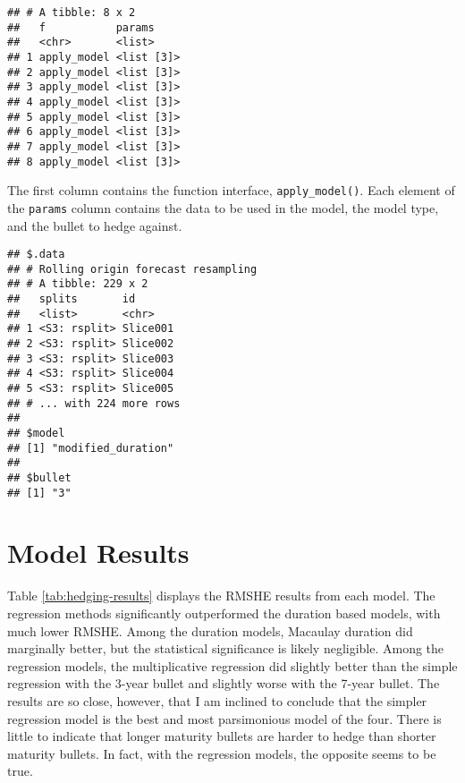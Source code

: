 \documentclass[openany]{book}
\newenvironment{Shaded}{\begin{snugshade}}{\end{snugshade}}
\newcommand{\DecValTok}[1]{\textcolor[rgb]{0.00,0.00,0.81}{#1}}
\newcommand{\NormalTok}[1]{#1}
\newcommand{\OperatorTok}[1]{\textcolor[rgb]{0.81,0.36,0.00}{\textbf{#1}}}
\theoremstyle{definition}
\theoremstyle{definition}
\theoremstyle{definition}
\theoremstyle{remark}
\begin{document}
\begin{verbatim}
## # A tibble: 8 x 2
##   f           params    
##   <chr>       <list>    
## 1 apply_model <list [3]>
## 2 apply_model <list [3]>
## 3 apply_model <list [3]>
## 4 apply_model <list [3]>
## 5 apply_model <list [3]>
## 6 apply_model <list [3]>
## 7 apply_model <list [3]>
## 8 apply_model <list [3]>
\end{verbatim}

\normalsize

The first column contains the function interface,
\texttt{apply\_model()}. Each element of the \texttt{params} column
contains the data to be used in the model, the model type, and the
bullet to hedge against.

\small

\begin{Shaded}
\end{Shaded}

\begin{verbatim}
## $.data
## # Rolling origin forecast resampling 
## # A tibble: 229 x 2
##   splits       id      
##   <list>       <chr>   
## 1 <S3: rsplit> Slice001
## 2 <S3: rsplit> Slice002
## 3 <S3: rsplit> Slice003
## 4 <S3: rsplit> Slice004
## 5 <S3: rsplit> Slice005
## # ... with 224 more rows
## 
## $model
## [1] "modified_duration"
## 
## $bullet
## [1] "3"
\end{verbatim}

\normalsize

\hypertarget{model-results}{%
\section{Model Results}\label{model-results}}

Table \ref{tab:hedging-results} displays the RMSHE results from each
model. The regression methods significantly outperformed the duration
based models, with much lower RMSHE. Among the duration models, Macaulay
duration did marginally better, but the statistical significance is
likely negligible. Among the regression models, the multiplicative
regression did slightly better than the simple regression with the
3-year bullet and slightly worse with the 7-year bullet. The results are
so close, however, that I am inclined to conclude that the simpler
regression model is the best and most parsimonious model of the four.
There is little to indicate that longer maturity bullets are harder to
hedge than shorter maturity bullets. In fact, with the regression
models, the opposite seems to be true.
\end{document}
